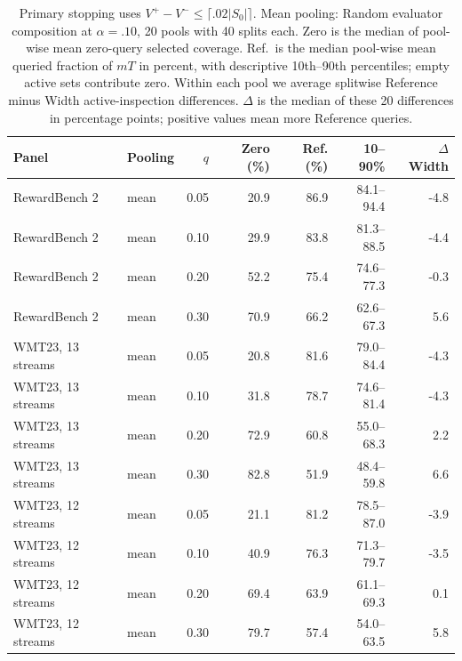 \begin{table}[t]
\centering\small
\begin{tabular}{llrrrrr}
\toprule
Panel & Pooling & $q$ & Zero (\%) & Ref. (\%) & 10--90\% & $\Delta$ Width \\
\midrule
RewardBench 2 & mean & 0.05 & 20.9 & 86.9 & 84.1--94.4 & -4.8 \\
RewardBench 2 & mean & 0.10 & 29.9 & 83.8 & 81.3--88.5 & -4.4 \\
RewardBench 2 & mean & 0.20 & 52.2 & 75.4 & 74.6--77.3 & -0.3 \\
RewardBench 2 & mean & 0.30 & 70.9 & 66.2 & 62.6--67.3 & 5.6 \\
WMT23, 13 streams & mean & 0.05 & 20.8 & 81.6 & 79.0--84.4 & -4.3 \\
WMT23, 13 streams & mean & 0.10 & 31.8 & 78.7 & 74.6--81.4 & -4.3 \\
WMT23, 13 streams & mean & 0.20 & 72.9 & 60.8 & 55.0--68.3 & 2.2 \\
WMT23, 13 streams & mean & 0.30 & 82.8 & 51.9 & 48.4--59.8 & 6.6 \\
WMT23, 12 streams & mean & 0.05 & 21.1 & 81.2 & 78.5--87.0 & -3.9 \\
WMT23, 12 streams & mean & 0.10 & 40.9 & 76.3 & 71.3--79.7 & -3.5 \\
WMT23, 12 streams & mean & 0.20 & 69.4 & 63.9 & 61.1--69.3 & 0.1 \\
WMT23, 12 streams & mean & 0.30 & 79.7 & 57.4 & 54.0--63.5 & 5.8 \\
\bottomrule
\end{tabular}
\caption{Primary stopping uses $V^+-V^-\le\lceil.02|S_0|\rceil$. Mean pooling: Random evaluator composition at $\alpha=.10$, 20 pools with 40 splits each. Zero is the median of pool-wise mean zero-query selected coverage. Ref.\ is the median pool-wise mean queried fraction of $mT$ in percent, with descriptive 10th--90th percentiles; empty active sets contribute zero. Within each pool we average splitwise Reference minus Width active-inspection differences. $\Delta$ is the median of these 20 differences in percentage points; positive values mean more Reference queries.}
\label{tab:review-composition-mean}
\end{table}
